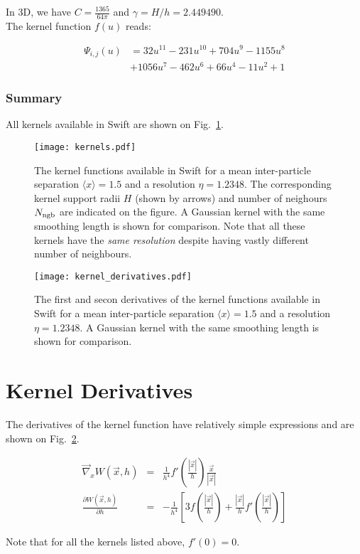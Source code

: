 \documentclass[a4paper]{mnras}
\newcommand{\swift}{{\sc Swift}\xspace}
\begin{document}
In 3D, we have $C=\frac{1365}{64\pi}$ and $\gamma=H/h = 2.449490$.\\
The kernel function $f(u)$ reads:

\begin{align}
  \Psi_{i,j}(u) &= 32u^{11} - 231u^{10} + 704u^9 - 1155u^8\\
  & + 1056u^7 - 462u^6 + 66u^4 - 11u^2 + 1
    \nonumber
\end{align}


\subsubsection{Summary}

All kernels available in \swift are shown on Fig.~\ref{fig:sph:kernels}.

\begin{figure}
\texttt{[image: kernels.pdf]}
\caption{The kernel functions available in \swift for a mean
  inter-particle separation $\langle x\rangle=1.5$ and a resolution
  $\eta=1.2348$. The corresponding kernel support radii $H$ (shown by
  arrows) and number of neighours $N_{\rm ngb}$ are indicated on the
  figure. A Gaussian kernel with the same smoothing length is shown
  for comparison. Note that all these kernels have the \emph{same
    resolution} despite having vastly different number of neighbours.}
\label{fig:sph:kernels}
\end{figure}

\begin{figure}
\texttt{[image: kernel\_derivatives.pdf]}
\caption{The first and secon derivatives of the kernel functions
  available in \swift for a mean inter-particle separation $\langle
  x\rangle=1.5$ and a resolution $\eta=1.2348$.  A Gaussian kernel
  with the same smoothing length is shown for comparison.}
\label{fig:sph:kernel_derivatives}
\end{figure}


\section{Kernel Derivatives}

The derivatives of the kernel function have relatively simple
expressions and are shown on Fig.~\ref{fig:sph:kernel_derivatives}.

\begin{eqnarray*}
 \vec\nabla_x W(\vec{x},h) &=& \frac{1}{h^4}f'\left(\frac{|\vec{x}|}{h}\right) \frac{\vec{x}}{|\vec{x}|} \\
 \frac{\partial W(\vec{x},h)}{\partial h} &=&- \frac{1}{h^4}\left[3f\left(\frac{|\vec{x}|}{h}\right) + 
\frac{|\vec{x}|}{h}f'\left(\frac{|\vec{x}|}{h}\right)\right]
\end{eqnarray*}

Note that for all the kernels listed above, $f'(0) = 0$. 
\end{document}
